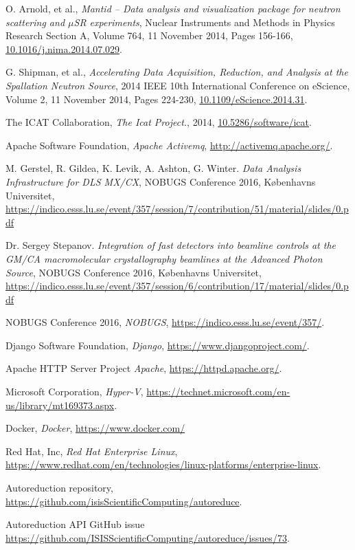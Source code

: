 \documentclass[twocolumn]{article}
\begin{document}
\begin{thebibliography}{99}
    O. Arnold, et al.,
    \emph{Mantid -- Data analysis and visualization package for neutron scattering and $\mu$SR experiments},
    Nuclear Instruments and Methods in Physics Research Section A, Volume 764, 11 November 2014, Pages 156-166,
    \href{http://dx.doi.org/10.1016/j.nima.2014.07.029}{10.1016/j.nima.2014.07.029}.

    G. Shipman, et al.,
    \emph{Accelerating Data Acquisition, Reduction, and Analysis at the Spallation Neutron Source},
    2014 IEEE 10th International Conference on eScience, Volume 2, 11 November 2014, Pages 224-230,
    \href{http://dx.doi.org/10.1109/eScience.2014.31}{10.1109/eScience.2014.31}.
    
    The ICAT Collaboration,
    \emph{The Icat Project.},
    2014,
    \href{https://doi.org/10.5286/SOFTWARE/ICAT}{10.5286/software/icat}.
    
    Apache Software Foundation,
    \emph{Apache Activemq},
    \url{http://activemq.apache.org/}.

	M. Gerstel, R. Gildea, K. Levik, A. Ashton, G. Winter.
	\emph{Data Analysis Infrastructure for DLS MX/CX},
	NOBUGS Conference 2016, Københavns Universitet,
	\url{https://indico.esss.lu.se/event/357/session/7/contribution/51/material/slides/0.pdf}

	Dr. Sergey Stepanov.
	\emph{Integration of fast detectors into beamline controls at the GM/CA macromolecular crystallography beamlines at the Advanced Photon Source},
	NOBUGS Conference 2016, Københavns Universitet,
	\url{https://indico.esss.lu.se/event/357/session/6/contribution/17/material/slides/0.pdf}

	NOBUGS Conference 2016,
	\emph{NOBUGS},
	\url{https://indico.esss.lu.se/event/357/}.
    
    Django Software Foundation,
    \emph{Django},
    \url{https://www.djangoproject.com/}.

	Apache HTTP Server Project
	\emph{Apache},
	\url{https://httpd.apache.org/}.
	
    Microsoft Corporation,
    \emph{Hyper-V},
    \url{https://technet.microsoft.com/en-us/library/mt169373.aspx}.

	Docker,
	\emph{Docker},
	\url{https://www.docker.com/}
    
    Red Hat, Inc,
    \emph{Red Hat Enterprise Linux},
    \url{https://www.redhat.com/en/technologies/linux-platforms/enterprise-linux}.
    
    Autoreduction repository,
    \url{https://github.com/isisScientificComputing/autoreduce}.
    
  Autoreduction API GitHub issue
  \url{https://github.com/ISISScientificComputing/autoreduce/issues/73}.

\end{thebibliography}
\end{document}
